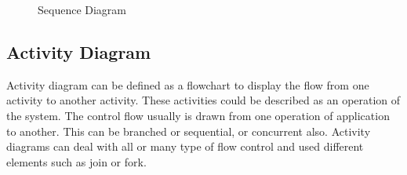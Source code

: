 \documentclass[oneside,a4paper,12pt]{report}
\begin{document}
\begin{center}
	\begin{figure}[!htbp]
		\centering
 	    \caption{Sequence Diagram}
	    \label{fig:Sequence Diagram}
	\end{figure}
\end{center}

\newpage
\subsection{Activity Diagram}
\hspace*{0.5cm} Activity diagram can be defined as a flowchart to display the flow from one activity to another activity. These activities could be described as an operation of the system. The control flow usually is drawn from one operation of application to another. This can be branched or sequential, or concurrent also. Activity diagrams can deal with all or many type of flow control and used different elements such as join or fork.
\end{document}
